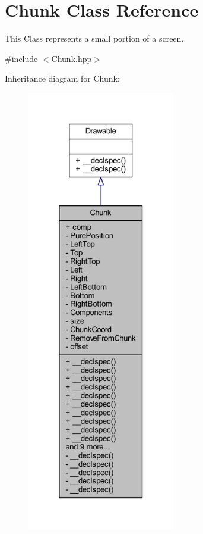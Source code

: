 \hypertarget{class_chunk}{\section{Chunk Class Reference}
\label{class_chunk}
}


This Class represents a small portion of a screen.  




{\ttfamily \#include $<$Chunk.\-hpp$>$}



Inheritance diagram for Chunk\-:
\nopagebreak
\begin{figure}[H]
\begin{center}
\leavevmode
\includegraphics[height=550pt]{class_chunk__inherit__graph}
\end{center}
\end{figure}


